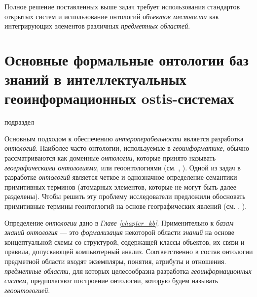 Полное решение поставленных выше задач требует использования стандартов открытых систем и использование онтологий \textit{объектов местности} как интегрирующих элементов различных \textit{предметных областей}.

\section{Основные формальные онтологии баз знаний в интеллектуальных геоинформационных ostis-системах}
\label{chapter_gis_sec_components}

\begin{SCn}	
\begin{scnrelfromlist}{подраздел}
\end{scnrelfromlist}
\end{SCn}

Основным подходом к обеспечению \textit{интероперабельности} является разработка \textit{онтологий}. Наиболее часто онтологии, используемые в \textit{геоинформатике}, обычно рассматриваются как доменные \textit{онтологии}, которые принято называть \textit{географическими онтологиями}, или геоонтологиями (см. , ). Одной из задач в разработке \textit{онтологий} является четкое и однозначное определение семантики примитивных терминов (атомарных элементов, которые не могут быть далее разделены). Чтобы решить эту проблему исследователи предложили обосновать примитивные термины геонтоглогий на основе географических явлений (см. , ).

Определение \textit{онтологии} дано в \textit{Главе \ref{chapter_kb}}. Применительно к \textit{базам знаний} \textit{онтология} --- это \textit{формализация} некоторой области \textit{знаний} на основе концептуальной схемы со структурой, содержащей классы объектов, их связи и правила, допускающей компьютерный анализ. Соответственно в состав онтологии предметной области входят экземпляры, понятия, атрибуты и отношения.
\textit{предметные области}, для которых целесообразна разработка \textit{геоинформационных систем}, предполагают построение онтологии, которую будем называть \textit{геоонтологией}.

